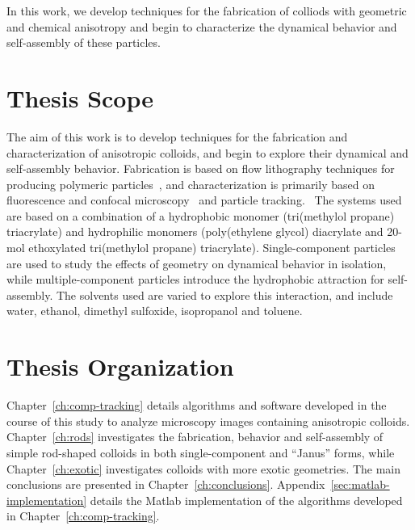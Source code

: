 In this work, we develop techniques for
the fabrication of colliods with geometric and chemical anisotropy and begin to characterize the dynamical behavior
and self-assembly of these particles.

\section{Thesis Scope}

The aim of this work is to develop techniques for the fabrication and characterization of anisotropic colloids, and begin
to explore their dynamical and self-assembly behavior.  Fabrication is based on flow lithography
techniques for producing polymeric particles~\cite{dendukuri-cfl, dendukuri-sfl}, 
and characterization is primarily based on fluorescence and confocal 
microscopy~\cite{weitz-confocal} and particle 
tracking.~\cite{crocker-grier-spheres,rods-mohraz}
The systems used are based on a combination of a hydrophobic monomer (tri(methylol propane) triacrylate) and hydrophilic 
monomers (poly(ethylene glycol) diacrylate and 20-mol ethoxylated tri(methylol propane) triacrylate). 
Single-component particles are used to study the effects of
geometry on dynamical behavior in isolation, while multiple-component particles introduce 
the hydrophobic attraction for self-assembly.  The solvents used are 
varied to explore this interaction, and include
water, ethanol, dimethyl sulfoxide, isopropanol and toluene.

\section{Thesis Organization}

Chapter~\ref{ch:comp-tracking}
details algorithms and software developed in the course of this study to analyze microscopy images containing 
anisotropic colloids.  Chapter~\ref{ch:rods} investigates the fabrication, behavior and self-assembly of simple rod-shaped colloids
in both single-component and ``Janus'' forms, while Chapter~\ref{ch:exotic} 
investigates colloids with more exotic geometries. The main
conclusions are presented in Chapter~\ref{ch:conclusions}.  
Appendix~\ref{sec:matlab-implementation} details the Matlab implementation of the algorithms developed in
Chapter~\ref{ch:comp-tracking}.
